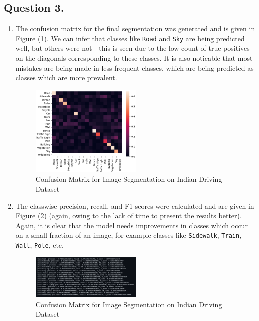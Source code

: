 \documentclass[10pt]{article}
\begin{document}
    \subsection*{\textbf{Question 3.}}
    \begin{enumerate}[label=(\alph*)]
        \item The confusion matrix for the final segmentation was generated and is given in Figure
        (\ref{fig:deeplab-conf-matrix}). We can infer that classes like \texttt{Road} and \texttt{Sky} are being predicted well,
        but others were not - this is seen due to the low count of true positives on the diagonals
        corresponding to these classes. It is also noticable that most mistakes are being made in
        less frequent classes, which are being predicted as classes which are more prevalent.
        \begin{figure}[h!]
            \centering
            \includegraphics[width=0.5\textwidth]{Assets/Segmentation/Metrics/05}
            \caption{Confusion Matrix for Image Segmentation on Indian Driving Dataset}
            \label{fig:deeplab-conf-matrix}
        \end{figure}
        \item The classwise precision, recall, and F1-scores were calculated and are given in Figure
        (\ref{fig:precision-recall-f1-screenshot}) (again, owing to the lack of time to present the
        results better). Again, it is clear that the model needs improvements in classes which occur
        on a small fraction of an image, for example classes like \texttt{Sidewalk}, \texttt{Train},
        \texttt{Wall}, \texttt{Pole}, etc.
        \begin{figure}[h!]
            \centering
            \includegraphics[width=0.5\textwidth]{Assets/Segmentation/Metrics/04}
            \caption{Confusion Matrix for Image Segmentation on Indian Driving Dataset}
            \label{fig:precision-recall-f1-screenshot}
        \end{figure}
    \end{enumerate}
\end{document}
